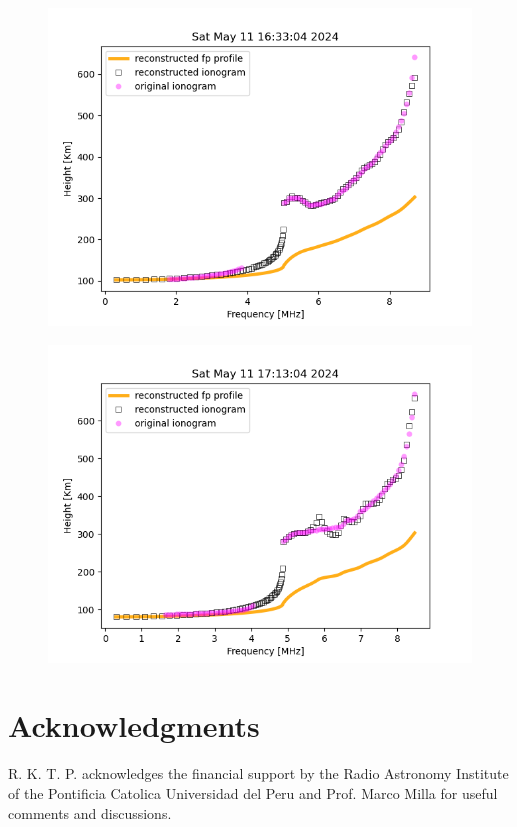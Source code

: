 \documentclass[aps,twocolumn,prb,showpacs,superscriptaddress]{revtex4-2}
\newcommand{\+}{\dagger}
\begin{document}
\begin{figure}[htbp]
    \begin{center}
    \includegraphics*[width=0.90\columnwidth]{images/140.png}
    \end{center}
    \caption{}
    \label{fig:08}
\end{figure}

\begin{figure}[htbp]
    \begin{center}
    \includegraphics*[width=0.90\columnwidth]{images/148.png}
    \end{center}
    \caption{}
    \label{fig:09}
\end{figure}

\section*{Acknowledgments}
R. K. T. P. acknowledges the financial support by the Radio Astronomy Institute of the Pontificia Catolica Universidad del Peru and Prof. Marco
Milla for useful comments and discussions.
\end{document}
